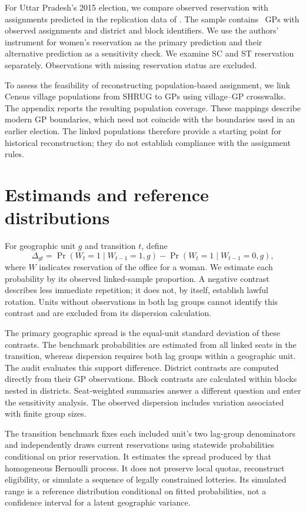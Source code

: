\documentclass[11pt]{article}
\begin{document}
For Uttar Pradesh's 2015 election, we compare observed reservation with assignments predicted in the replication data of \citet{cdm2025}. The sample contains \AuditN\ GPs with observed assignments and district and block identifiers. We use the authors' instrument for women's reservation as the primary prediction and their alternative prediction as a sensitivity check. We examine SC and ST reservation separately. Observations with missing reservation status are excluded.

To assess the feasibility of reconstructing population-based assignment, we link Census village populations from SHRUG to GPs using village--GP crosswalks. The appendix reports the resulting population coverage. These mappings describe modern GP boundaries, which need not coincide with the boundaries used in an earlier election. The linked populations therefore provide a starting point for historical reconstruction; they do not establish compliance with the assignment rules.

\section{Estimands and reference distributions}
For geographic unit $g$ and transition $t$, define
\[
\Delta_{gt}=\Pr(W_t=1\mid W_{t-1}=1,g)-\Pr(W_t=1\mid W_{t-1}=0,g),
\]
where $W$ indicates reservation of the office for a woman. We estimate each probability by its observed linked-sample proportion. A negative contrast describes less immediate repetition; it does not, by itself, establish lawful rotation. Units without observations in both lag groups cannot identify this contrast and are excluded from its dispersion calculation.

The primary geographic spread is the equal-unit standard deviation of these contrasts. The benchmark probabilities are estimated from all linked seats in the transition, whereas dispersion requires both lag groups within a geographic unit. The audit evaluates this support difference. District contrasts are computed directly from their GP observations. Block contrasts are calculated within blocks nested in districts. Seat-weighted summaries answer a different question and enter the sensitivity analysis. The observed dispersion includes variation associated with finite group sizes.

The transition benchmark fixes each included unit's two lag-group denominators and independently draws current reservations using statewide probabilities conditional on prior reservation. It estimates the spread produced by that homogeneous Bernoulli process. It does not preserve local quotas, reconstruct eligibility, or simulate a sequence of legally constrained lotteries. Its simulated range is a reference distribution conditional on fitted probabilities, not a confidence interval for a latent geographic variance.
\end{document}
